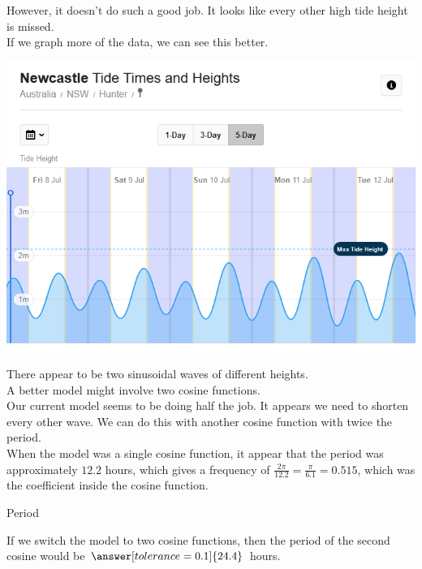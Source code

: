 \documentclass{ximera}
\begin{document}
However, it doesn't do such a good job. It looks like every other high tide height is missed.\\


If we graph more of the data, we can see this better.





\begin{image}
\includegraphics{pics/tides2.png}
\end{image}



There appear to be two sinusoidal waves of different heights.  \\

A better model might involve two cosine functions. \\


Our current model seems to be doing half the job.  It appears we need to shorten every other wave.  We can do this with another cosine function with twice the period. \\



When the model was a single cosine function, it appear that the period was approximately $12.2$ hours, which gives a frequency of $\frac{2 \pi}{12.2} = \frac{\pi}{6.1} = 0.515$, which was the coefficient inside the cosine function.  



\begin{question}  Period

If we switch the model to two cosine functions, then the period of the second cosine would be $\answer[tolerance=0.1]{24.4}$ hours.


\end{question}
\end{document}
